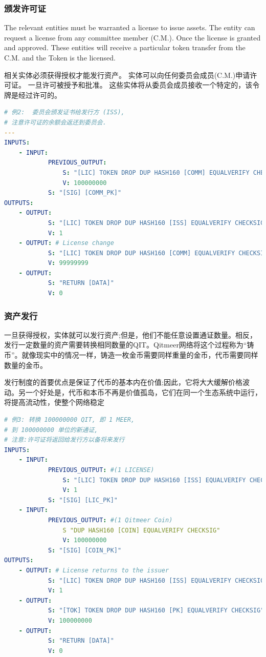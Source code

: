 \documentclass[a4paper,11pt]{article}
\begin{document}
\subsubsection{颁发许可证}

The relevant entities must be warranted a license to issue assets. The entity can request a license from any committee member (C.M.). Once the license is granted and approved. These entities will receive a particular token transfer from the C.M. and the Token is the licensed.

相关实体必须获得授权才能发行资产。
实体可以向任何委员会成员(C.M.)申请许可证。
一旦许可被授予和批准。
这些实体将从委员会成员接收一个特定的，该令牌是经过许可的。

\lstset{basicstyle=\tiny,style=myListStyle}
\begin{lstlisting}[language=yaml, numbers=none,basicstyle=\footnotesize]
# 例2:  委员会颁发证书给发行方 (ISS),
# 注意许可证的余额会返还到委员会.
---
INPUTS:
	- INPUT:
			PREVIOUS_OUTPUT:
				S: "[LIC] TOKEN DROP DUP HASH160 [COMM] EQUALVERIFY CHECKSIG"
				V: 100000000
			S: "[SIG] [COMM_PK]"
OUTPUTS:
	- OUTPUT:
			S: "[LIC] TOKEN DROP DUP HASH160 [ISS] EQUALVERIFY CHECKSIG"
			V: 1
	- OUTPUT: # License change
			S: "[LIC] TOKEN DROP DUP HASH160 [COMM] EQUALVERIFY CHECKSIG"
			V: 99999999
	- OUTPUT:
			S: "RETURN [DATA]"
			V: 0
\end{lstlisting}

\subsubsection{资产发行}
一旦获得授权，实体就可以发行资产;但是，他们不能任意设置通证数量。相反，发行一定数量的资产需要转换相同数量的QIT。Qitmeer网络将这个过程称为“铸币”。就像现实中的情况一样，铸造一枚金币需要同样重量的金币，代币需要同样数量的金币。

发行制度的首要优点是保证了代币的基本内在价值;因此，它将大大缓解价格波动。另一个好处是，代币和本币不再是价值孤岛，它们在同一个生态系统中运行，将提高流动性，使整个网络稳定

\lstset{basicstyle=\tiny,style=myListStyle}
\begin{lstlisting}[language=yaml, numbers=none,basicstyle=\footnotesize]
# 例3: 转换 100000000 QIT, 即 1 MEER,
# 到 100000000 单位的新通证,
# 注意:许可证将返回给发行方以备将来发行
INPUTS:
	- INPUT:
			PREVIOUS_OUTPUT: #(1 LICENSE)
				S: "[LIC] TOKEN DROP DUP HASH160 [ISS] EQUALVERIFY CHECKSIG"
				V: 1
			S: "[SIG] [LIC_PK]"
	- INPUT:
			PREVIOUS_OUTPUT: #(1 Qitmeer Coin)
				S "DUP HASH160 [COIN] EQUALVERIFY CHECKSIG"
				V: 100000000
			S: "[SIG] [COIN_PK]"
OUTPUTS:
	- OUTPUT: # License returns to the issuer
			S: "[LIC] TOKEN DROP DUP HASH160 [ISS] EQUALVERIFY CHECKSIG"
			V: 1
	- OUTPUT:
			S: "[TOK] TOKEN DROP DUP HASH160 [PK] EQUALVERIFY CHECKSIG"
			V: 100000000
	- OUTPUT:
			S: "RETURN [DATA]"
			V: 0
\end{lstlisting}
\end{document}
